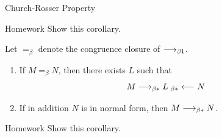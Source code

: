 \begin{frame}[allowframebreaks]{Church-Rosser Property}
\begin{block}{Homework}
  Show this corollary.
\end{block}

\begin{corollary}
  Let $=_\beta$ denote the congruence closure of $\longrightarrow_{\beta1}$. 
  \begin{enumerate}
    \item If $M =_\beta N$, then there exists $L$ such that 
      \[
        M \longrightarrow_{\beta*} L
        \; _{\beta*}\longleftarrow N
      \]
    \item If in addition $N$ is in normal form, then 
      $M \longrightarrow_{\beta*} N$. 
  \end{enumerate}
\end{corollary}
\begin{block}{Homework}
  Show this corollary.
\end{block}
\end{frame}

